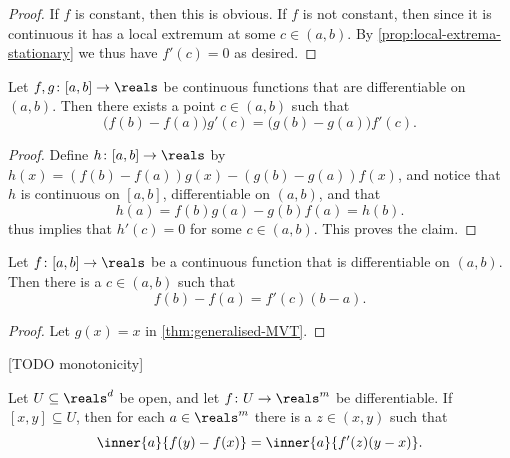 \documentclass[article, a4paper, 11pt, oneside]{memoir}
\numberwithin{equation}{chapter}
\begin{document}
\begin{proof}
    If $f$ is constant, then this is obvious. If $f$ is not constant, then since it is continuous it has a local extremum at some $c \in (a,b)$. By \cref{prop:local-extrema-stationary} we thus have $f'(c) = 0$ as desired.
\end{proof}


\begin{theorem}
    \label{thm:generalised-MVT}
    Let $f,g \colon [a,b] \to \reals$ be continuous functions that are differentiable on $(a,b)$. Then there exists a point $c \in (a,b)$ such that
    \begin{equation*}
        \bigl( f(b) - f(a) \bigr) g'(c)
            = \bigl( g(b) - g(a) \bigr) f'(c).
    \end{equation*}
\end{theorem}

\begin{proof}
    Define $h \colon [a,b] \to \reals$ by $h(x) = (f(b) - f(a)) g(x) - (g(b) - g(a)) f(x)$, and notice that $h$ is continuous on $[a,b]$, differentiable on $(a,b)$, and that
    \begin{equation*}
        h(a)
            = f(b)g(a) - g(b)f(a)
            = h(b).
    \end{equation*}
     thus implies that $h'(c) = 0$ for some $c \in (a,b)$. This proves the claim.
\end{proof}


\begin{corollary}
    \label{cor:MVT}
    Let $f \colon [a,b] \to \reals$ be a continuous function that is differentiable on $(a,b)$. Then there is a $c \in (a,b)$ such that
    \begin{equation*}
        f(b) - f(a)
            = f'(c) (b-a).
    \end{equation*}
\end{corollary}

\begin{proof}
    Let $g(x) = x$ in \cref{thm:generalised-MVT}.
\end{proof}

[TODO monotonicity]


\begin{theorem}
    \label{thm:multidimensional-MVT}
    Let $U \subseteq \reals^d$ be open, and let $f \colon U \to \reals^m$ be differentiable. If $[x,y] \subseteq U$, then for each $a \in \reals^m$ there is a $z \in (x,y)$ such that
    \begin{equation*}
        \inner{a}{f(y) - f(x)}
            = \inner{a}{f'(z)(y - x)}.
    \end{equation*}
\end{theorem}
\end{document}
